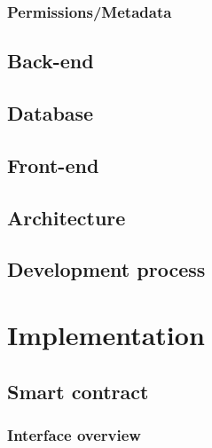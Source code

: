 \documentclass[12pt]{article}
\begin{document}
\subsubsection{Permissions/Metadata}


\subsection{Back-end}

\subsection{Database}

\subsection{Front-end}

\subsection{Architecture}

\subsection{Development process}

\section{Implementation}

\subsection{Smart contract}

\subsubsection{Interface overview}
\end{document}
